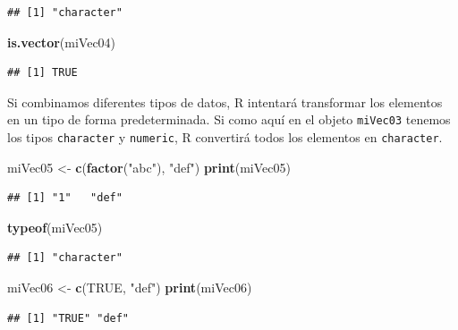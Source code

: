 \documentclass[]{book}
\newenvironment{Shaded}{\begin{snugshade}}{\end{snugshade}}
\newcommand{\KeywordTok}[1]{\textcolor[rgb]{0.13,0.29,0.53}{\textbf{#1}}}
\newcommand{\StringTok}[1]{\textcolor[rgb]{0.31,0.60,0.02}{#1}}
\newcommand{\OtherTok}[1]{\textcolor[rgb]{0.56,0.35,0.01}{#1}}
\newcommand{\NormalTok}[1]{#1}
\begin{document}
\begin{verbatim}
## [1] "character"
\end{verbatim}

\begin{Shaded}
\begin{Highlighting}[]
\KeywordTok{is.vector}\NormalTok{(miVec04)}
\end{Highlighting}
\end{Shaded}

\begin{verbatim}
## [1] TRUE
\end{verbatim}

Si combinamos diferentes tipos de datos, R intentará transformar los
elementos en un tipo de forma predeterminada. Si como aquí en el objeto
\texttt{miVec03} tenemos los tipos \texttt{character} y
\texttt{numeric}, R convertirá todos los elementos en
\texttt{character}.

\begin{Shaded}
\begin{Highlighting}[]
\NormalTok{miVec05 <-}\StringTok{ }\KeywordTok{c}\NormalTok{(}\KeywordTok{factor}\NormalTok{(}\StringTok{"abc"}\NormalTok{), }\StringTok{"def"}\NormalTok{)}
\KeywordTok{print}\NormalTok{(miVec05)}
\end{Highlighting}
\end{Shaded}

\begin{verbatim}
## [1] "1"   "def"
\end{verbatim}

\begin{Shaded}
\begin{Highlighting}[]
\KeywordTok{typeof}\NormalTok{(miVec05)}
\end{Highlighting}
\end{Shaded}

\begin{verbatim}
## [1] "character"
\end{verbatim}

\begin{Shaded}
\begin{Highlighting}[]
\NormalTok{miVec06 <-}\StringTok{ }\KeywordTok{c}\NormalTok{(}\OtherTok{TRUE}\NormalTok{, }\StringTok{"def"}\NormalTok{)}
\KeywordTok{print}\NormalTok{(miVec06)}
\end{Highlighting}
\end{Shaded}

\begin{verbatim}
## [1] "TRUE" "def"
\end{verbatim}
\end{document}
